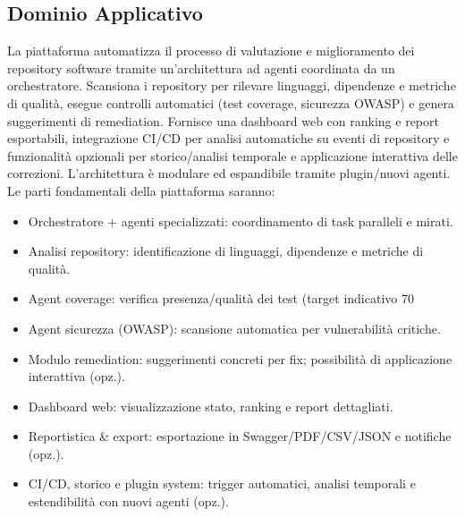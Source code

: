 \documentclass[a4paper,12pt]{article}
\begin{document}
    \subsection{Dominio Applicativo}
    La piattaforma automatizza il processo di valutazione e miglioramento dei repository software tramite un’architettura ad agenti coordinata da un orchestratore. Scansiona i repository per rilevare linguaggi, dipendenze e metriche di qualità, esegue controlli automatici (test coverage, sicurezza OWASP) e genera suggerimenti di remediation. Fornisce una dashboard web con ranking e report esportabili, integrazione CI/CD per analisi automatiche su eventi di repository e funzionalità opzionali per storico/analisi temporale e applicazione interattiva delle correzioni. L’architettura è modulare ed espandibile tramite plugin/nuovi agenti.\\

    Le parti fondamentali della piattaforma saranno:
    \begin{itemize}
        \item Orchestratore + agenti specializzati: coordinamento di task paralleli e mirati.
        \item Analisi repository: identificazione di linguaggi, dipendenze e metriche di qualità.
        \item Agent coverage: verifica presenza/qualità dei test (target indicativo 70%
        \item Agent sicurezza (OWASP): scansione automatica per vulnerabilità critiche.
        \item Modulo remediation: suggerimenti concreti per fix; possibilità di applicazione interattiva (opz.).
        \item Dashboard web: visualizzazione stato, ranking e report dettagliati.
        \item Reportistica \& export: esportazione in Swagger/PDF/CSV/JSON e notifiche (opz.).
        \item CI/CD, storico e plugin system: trigger automatici, analisi temporali e estendibilità con nuovi agenti (opz.).
    \end{itemize}
\end{document}
